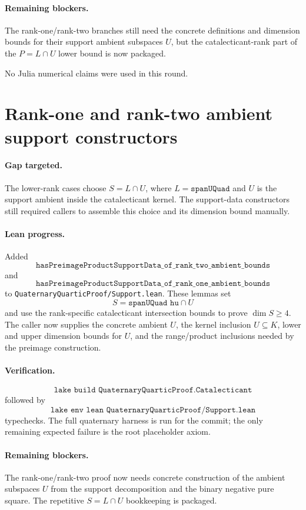 \documentclass[11pt]{article}
\begin{document}
\paragraph{Remaining blockers.}
The rank-one/rank-two branches still need the concrete definitions and
dimension bounds for their support ambient subspaces \(U\), but the
catalecticant-rank part of the \(P=L\cap U\) lower bound is now packaged.

No Julia numerical claims were used in this round.

\section*{Rank-one and rank-two ambient support constructors}

\paragraph{Gap targeted.}
The lower-rank cases choose \(S=L\cap U\), where
\(L=\texttt{spanUQuad}\) and \(U\) is the support ambient inside the
catalecticant kernel.  The support-data constructors still required callers to
assemble this choice and its dimension bound manually.

\paragraph{Lean progress.}
Added
\[
\texttt{hasPreimageProductSupportData\_of\_rank\_two\_ambient\_bounds}
\]
and
\[
\texttt{hasPreimageProductSupportData\_of\_rank\_one\_ambient\_bounds}
\]
to \texttt{QuaternaryQuarticProof/Support.lean}.  These lemmas set
\[
S=\texttt{spanUQuad hu} \cap U
\]
and use the rank-specific catalecticant intersection bounds to prove
\(\dim S\ge4\).  The caller now supplies the concrete ambient \(U\), the
kernel inclusion \(U\subseteq K\), lower and upper dimension bounds for \(U\),
and the range/product inclusions needed by the preimage construction.

\paragraph{Verification.}
\[
\texttt{lake build QuaternaryQuarticProof.Catalecticant}
\]
followed by
\[
\texttt{lake env lean QuaternaryQuarticProof/Support.lean}
\]
typechecks.  The full quaternary harness is run for the commit; the only
remaining expected failure is the root placeholder axiom.

\paragraph{Remaining blockers.}
The rank-one/rank-two proof now needs concrete construction of the ambient
subspaces \(U\) from the support decomposition and the binary negative pure
square.  The repetitive \(S=L\cap U\) bookkeeping is packaged.
\end{document}
